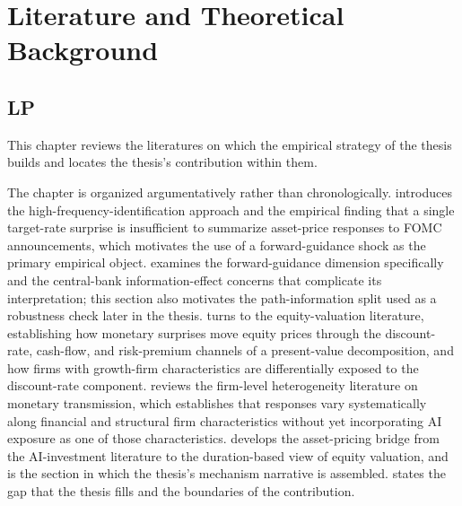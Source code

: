 \chapter{Literature and Theoretical Background}
\label{ch:literature}

\section{LP}

This chapter reviews the literatures on which the empirical strategy
of the thesis builds and locates the thesis's contribution within
them.

The chapter is organized argumentatively rather than chronologically.
 introduces the high-frequency-identification
approach and the empirical finding that a single target-rate surprise
is insufficient to summarize asset-price responses to FOMC announcements,
which motivates the use of a forward-guidance shock as the primary
empirical object.  examines the
forward-guidance dimension specifically and the central-bank
information-effect concerns that complicate its interpretation; this
section also motivates the path-information split used as a robustness
check later in the thesis. 
turns to the equity-valuation literature, establishing how monetary
surprises move equity prices through the discount-rate, cash-flow,
and risk-premium channels of a present-value decomposition, and how
firms with growth-firm characteristics are differentially exposed to
the discount-rate component. 
reviews the firm-level heterogeneity literature on monetary
transmission, which establishes that responses vary systematically
along financial and structural firm characteristics without yet
incorporating AI exposure as one of those characteristics.
 develops the asset-pricing
bridge from the AI-investment literature to the duration-based view
of equity valuation, and is the section in which the thesis's
mechanism narrative is assembled.  states
the gap that the thesis fills and the boundaries of the contribution.

